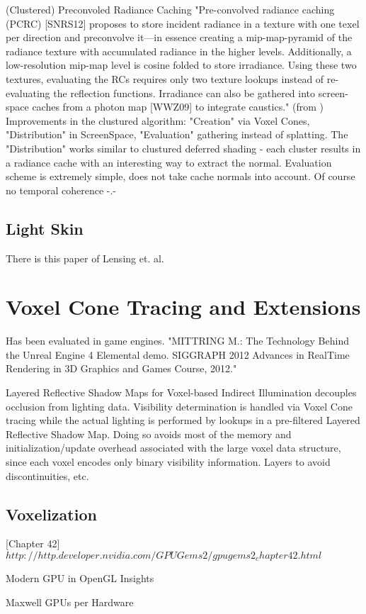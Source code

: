 \documentclass[thesis.tex]{subfiles}
\begin{document}
(Clustered) Preconvoled Radiance Caching \cite{bib:clusteredpreconvoledradiancecaching}
"Pre-convolved radiance caching (PCRC) [SNRS12] proposes to store incident radiance in a texture with one texel per direction and preconvolve it—in essence creating a mip-map-pyramid of the
radiance texture with accumulated radiance in the higher
levels. Additionally, a low-resolution mip-map level is cosine folded to store irradiance. Using these two textures, evaluating the RCs requires only two texture lookups instead of re-evaluating the reflection functions. Irradiance can also be gathered into screen-space caches from a photon map [WWZ09] to integrate caustics." (from \cite{bib:clusteredpreconvoledradiancecaching})\\
Improvements in the clustured algorithm: "Creation" via Voxel Cones, "Distribution" in ScreenSpace, "Evaluation" gathering instead of splatting. The "Distribution" works similar to clustured deferred shading - each cluster results in a radiance cache with an interesting way to extract the normal. Evaluation scheme is extremely simple, does not take cache normals into account. Of course no temporal coherence -.-

\subsection{Light Skin}
There is this paper \cite{bib:LightskinPaper} of Lensing et. al.


\section{Voxel Cone Tracing and Extensions}

 Has been evaluated in game engines. "MITTRING M.: The Technology Behind the Unreal Engine 4 Elemental demo. SIGGRAPH 2012 Advances in RealTime Rendering in 3D Graphics and Games Course, 2012." 

Layered Reflective Shadow Maps for Voxel-based Indirect Illumination decouples occlusion from lighting data.
Visibility determination is handled via Voxel Cone tracing while the actual lighting is performed by lookups in a pre-filtered Layered Reflective Shadow Map.
Doing so avoids most of the memory and initialization/update overhead associated with the large voxel data structure, since each voxel encodes only binary visibility information.
Layers to avoid discontinuities, etc.

\subsection{Voxelization}

\cite{bib:GPUGems2}[Chapter 42] $http://http.developer.nvidia.com/GPUGems2/gpugems2_chapter42.html$

Modern GPU in OpenGL Insights \cite{bib:openglinsightsvoxel}

Maxwell GPUs per Hardware

\subfilebib %
\end{document}
